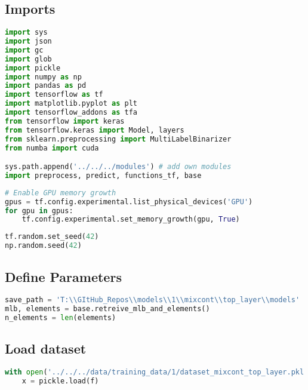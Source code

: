 \hypertarget{imports}{%
\subsection{Imports}\label{imports}}

\begin{lstlisting}[language=Python]
import sys
import json
import gc
import glob
import pickle
import numpy as np
import pandas as pd
import tensorflow as tf
import matplotlib.pyplot as plt
import tensorflow_addons as tfa
from tensorflow import keras
from tensorflow.keras import Model, layers
from sklearn.preprocessing import MultiLabelBinarizer
from numba import cuda

sys.path.append('../../../modules') # add own modules
import preprocess, predict, functions_tf, base
\end{lstlisting}

\begin{lstlisting}[language=Python]
# Enable GPU memory growth
gpus = tf.config.experimental.list_physical_devices('GPU')
for gpu in gpus:
    tf.config.experimental.set_memory_growth(gpu, True)
\end{lstlisting}

\begin{lstlisting}[language=Python]
tf.random.set_seed(42)
np.random.seed(42)
\end{lstlisting}

\hypertarget{define-parameters}{%
\subsection{Define Parameters}\label{define-parameters}}

\begin{lstlisting}[language=Python]
save_path = 'T:\\GItHub_Repos\\models\\1\\mixcont\\top_layer\\models'
mlb, elements = base.retreive_mlb_and_elements()
n_elements = len(elements)
\end{lstlisting}

\hypertarget{load-dataset}{%
\subsection{Load dataset}\label{load-dataset}}

\begin{lstlisting}[language=Python]
with open('../../../data/training_data/1/dataset_mixcont_top_layer.pkl', 'rb') as f:
    x = pickle.load(f)
\end{lstlisting}

